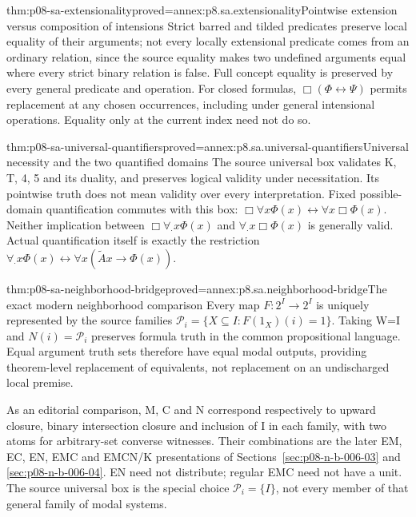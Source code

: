 \begin{hbtheorem}{thm:p08-sa-extensionality}{proved=annex:p8.sa.extensionality}{Pointwise extension versus composition of intensions}
Strict barred and tilded predicates preserve local equality of their
arguments; not every locally extensional predicate comes from an ordinary
relation, since the source equality makes two undefined arguments equal
where every strict binary relation is false. Full concept equality is
preserved by every general predicate and operation. For closed formulas,
\(\Box(\Phi\leftrightarrow\Psi)\) permits replacement at any chosen
occurrences, including under general intensional operations. Equality
only at the current index need not do so.
\end{hbtheorem}

\begin{hbtheorem}{thm:p08-sa-universal-quantifiers}{proved=annex:p8.sa.universal-quantifiers}{Universal necessity and the two quantified domains}
The source universal box validates K, T, 4, 5 and its duality, and preserves
logical validity under necessitation. Its pointwise truth does not mean
validity over every interpretation. Fixed possible-domain quantification
commutes with this box:
\(\Box\forall x\Phi(x)\leftrightarrow\forall x\Box\Phi(x)\).
Neither implication between \(\Box\forall_{\cdot}x\Phi(x)\)
and \(\forall_{\cdot}x\Box\Phi(x)\) is generally valid.
Actual quantification itself is exactly the restriction
\(\forall_{\cdot}x\Phi(x)\leftrightarrow
\forall x(\widetilde A x\to\Phi(x))\).
\end{hbtheorem}

\begin{hbtheorem}{thm:p08-sa-neighborhood-bridge}{proved=annex:p8.sa.neighborhood-bridge}{The exact modern neighborhood comparison}
Every map \(F:2^I\to2^I\) is uniquely represented by the source
families \(\mathscr P_i=\{X\subseteq I:F(1_X)(i)=1\}\).
Taking W=I and \(N(i)=\mathscr P_i\) preserves formula truth in
the common propositional language. Equal argument truth sets therefore
have equal modal outputs, providing theorem-level replacement of
equivalents, not replacement on an undischarged local premise.

As an editorial comparison, M, C and N correspond respectively to
upward closure, binary intersection closure and inclusion of I in each
family, with two atoms for arbitrary-set converse witnesses. Their
combinations are the later EM, EC, EN, EMC and EMCN/K presentations
of Sections~\ref{sec:p08-n-b-006-03} and \ref{sec:p08-n-b-006-04}.
EN need not distribute; regular EMC need not have a unit. The source
universal box is the special choice \(\mathscr P_i=\{I\}\),
not every member of that general family of modal systems.
\end{hbtheorem}

